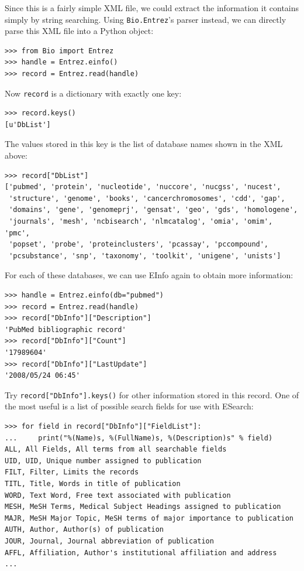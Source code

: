 \documentclass{report}
\begin{document}
Since this is a fairly simple XML file, we could extract the information it contains simply by string searching. Using \verb+Bio.Entrez+'s parser instead, we can directly parse this XML file into a Python object:
\begin{verbatim}
>>> from Bio import Entrez
>>> handle = Entrez.einfo()
>>> record = Entrez.read(handle)
\end{verbatim}
Now \verb+record+ is a dictionary with exactly one key:
\begin{verbatim}
>>> record.keys()
[u'DbList']
\end{verbatim}
The values stored in this key is the list of database names shown in the XML above:
\begin{verbatim}
>>> record["DbList"]
['pubmed', 'protein', 'nucleotide', 'nuccore', 'nucgss', 'nucest',
 'structure', 'genome', 'books', 'cancerchromosomes', 'cdd', 'gap',
 'domains', 'gene', 'genomeprj', 'gensat', 'geo', 'gds', 'homologene',
 'journals', 'mesh', 'ncbisearch', 'nlmcatalog', 'omia', 'omim', 'pmc',
 'popset', 'probe', 'proteinclusters', 'pcassay', 'pccompound',
 'pcsubstance', 'snp', 'taxonomy', 'toolkit', 'unigene', 'unists']
\end{verbatim}

For each of these databases, we can use EInfo again to obtain more information:
\begin{verbatim}
>>> handle = Entrez.einfo(db="pubmed")
>>> record = Entrez.read(handle)
>>> record["DbInfo"]["Description"]
'PubMed bibliographic record'
>>> record["DbInfo"]["Count"]
'17989604'
>>> record["DbInfo"]["LastUpdate"]
'2008/05/24 06:45'
\end{verbatim}
Try \verb+record["DbInfo"].keys()+ for other information stored in this record.
One of the most useful is a list of possible search fields for use with ESearch:

\begin{verbatim}
>>> for field in record["DbInfo"]["FieldList"]:
...     print("%(Name)s, %(FullName)s, %(Description)s" % field)
ALL, All Fields, All terms from all searchable fields
UID, UID, Unique number assigned to publication
FILT, Filter, Limits the records
TITL, Title, Words in title of publication
WORD, Text Word, Free text associated with publication
MESH, MeSH Terms, Medical Subject Headings assigned to publication
MAJR, MeSH Major Topic, MeSH terms of major importance to publication
AUTH, Author, Author(s) of publication
JOUR, Journal, Journal abbreviation of publication
AFFL, Affiliation, Author's institutional affiliation and address
...
\end{verbatim}
\end{document}
